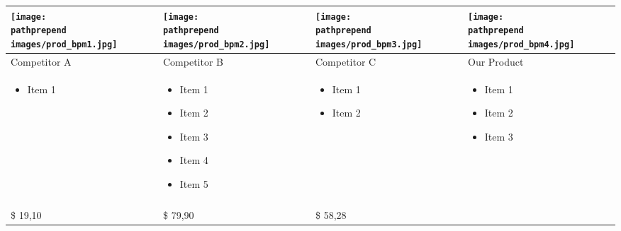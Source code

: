 \documentclass[11pt]{article}
\def\pathprepend{}%
\def\pathprepend{business_plan/}%
\begin{document}
\begin{tabular}{| m{92 pt} | m{92 pt} | m{92 pt} | m{92 pt} |}\hline
	\texttt{[image: \\pathprepend images/prod\_bpm1.jpg]} &
		\texttt{[image: \\pathprepend images/prod\_bpm2.jpg]} &
		\texttt{[image: \\pathprepend images/prod\_bpm3.jpg]} &
		\texttt{[image: \\pathprepend images/prod\_bpm4.jpg]} \\ \hline
	Competitor A & Competitor B & Competitor C & Our Product\\ \hline
	\begin{itemize} \tiny \item Item 1 \end{itemize} &
					\begin{itemize} \tiny
							\item Item 1
							\item Item 2
							\item Item 3
							\item Item 4
							\item Item 5\end{itemize} &
					\begin{itemize} \tiny
							\item Item 1
							\item Item 2\end{itemize}&
					\begin{itemize} \tiny
							\item Item 1
							\item Item 2
							\item Item 3 \end{itemize} \\
	& & & \\ \hline
	\$ 19,10 & \$ 79,90 & \$ 58,28 & \\ \hline
\end{tabular}
\end{document}
